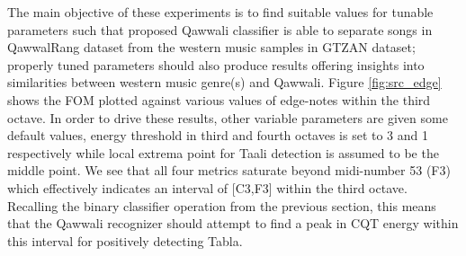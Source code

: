\documentclass{article}
\begin{document}
The main objective of these experiments is to find suitable values for tunable parameters such that proposed Qawwali classifier is able to separate songs in QawwalRang dataset from the western music samples in GTZAN dataset; properly tuned parameters should also produce results offering insights into similarities between western music genre(s) and Qawwali. Figure \ref{fig:src_edge} shows the FOM plotted against various values of edge-notes within the third octave. In order to drive these results, other variable parameters are given some default values, energy threshold in third and fourth octaves is set to 3 and 1 respectively while local extrema point for Taali detection is assumed to be the middle point.  We see that all four metrics saturate beyond midi-number 53 (F3) which effectively indicates an interval of [C3,F3] within the third octave. Recalling the binary classifier operation from the previous section, this means that the Qawwali recognizer should attempt to find a peak in CQT energy within this interval for positively detecting Tabla.
\end{document}
